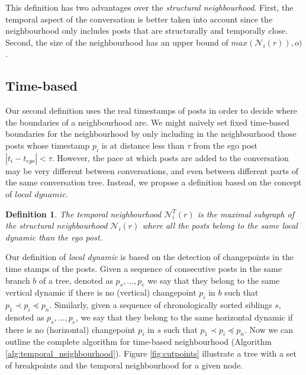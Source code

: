 \documentclass[9pt,technote]{IEEEtran}
\newtheorem{definition}{Definition}
\begin{document}
This definition has two advantages over the \textit{structural neighbourhood}. First, the temporal aspect of the conversation is better taken into account since the neighbourhood only includes posts that are structurally and temporally close. Second, the size of the neighbourhood has an upper bound of $max(\mathcal{N}_i(r)), o)$.

\subsection{Time-based}
Our second definition uses the real timestamps of posts in order to decide where the boundaries of a neighbourhood are. We might naively set fixed time-based boundaries for the neighbourhood by only including in the neighbourhood those posts whose timestamp $p_i$ is at distance less than $\tau$ from the ego post $|t_i-t_{ego}|<\tau$. However, the pace at which posts are added to the conversation may be very different between conversations, and even between different parts of the same conversation tree. Instead, we propose a definition based on the concept of $\textit{local dynamic}$. 

\begin{definition}
The temporal neighbourhood $\mathcal{N}_{i}^T(r)$ is the maximal subgraph of the structural neighbourhood $\mathcal{N}_i(r)$ where all the posts belong to the same local dynamic than the ego post.
\end{definition}
Our definition of \textit{local dynamic} is based on the detection of changepoints in the time stamps of the posts. Given a sequence of consecutive posts in the same branch $b$ of a tree, denoted as $p_s,...,p_e$ we say that they belong to the same vertical dynamic if there is no (vertical) changepoint $p_i$ in $b$ such that $p_1 \prec p_i \preceq p_n$. Similarly, given a sequence of chronologically sorted  siblings $s$, denoted as $p_s,...,p_e$, we say that they belong to the same horizontal dynamic if there is no (horizontal) changepoint $p_i$ in $s$ such that $p_1 \prec p_i \preceq p_n$. Now we can outline the complete algorithm for time-based neighbourhood (Algorithm \ref{alg:temporal_neighbourhood}). Figure \ref{fig:cutpoints} illustrate a tree with a set of breakpoints and the temporal neighbourhood for a given node.
\end{document}
